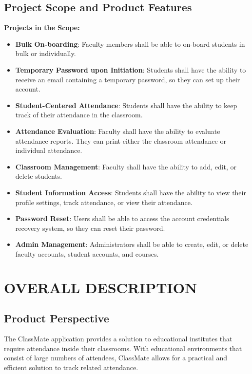 \documentclass[letterpaper,12pt,oneside,listof=totoc]{scrreprt}
\begin{document}
\section{Project Scope and Product Features}
\textbf{Projects in the Scope:} 
\begin{itemize}
    \item \textbf{Bulk On-boarding}: Faculty members shall be able to on-board students in bulk or individually.
    \item \textbf{Temporary Password upon Initiation}: Students shall have the ability to receive an email containing a temporary password, so they can set up their account.
    \item \textbf{Student-Centered Attendance}: Students shall have the ability to keep track of their attendance in the classroom.
    \item \textbf{Attendance Evaluation}: Faculty shall have the ability to evaluate attendance reports. They can print either the classroom attendance or individual attendance. 
    \item \textbf{Classroom Management}: Faculty shall have the ability to add, edit, or delete students.
    \item \textbf{Student Information Access}: Students shall have the ability to view their profile settings, track attendance, or view their attendance.
    \item \textbf{Password Reset}: Users shall be able to access the account credentials recovery system, so they can reset their password.
    \item \textbf{Admin Management}: Administrators shall be able to create, edit, or delete faculty accounts, student accounts, and courses.
\end{itemize}

\chapter{OVERALL DESCRIPTION}

\section{Product Perspective}
The ClassMate application provides a solution to educational institutes that require attendance inside their classrooms. With educational environments that consist of large numbers of attendees, ClassMate allows for a practical and efficient solution to track related attendance. 
\end{document}

